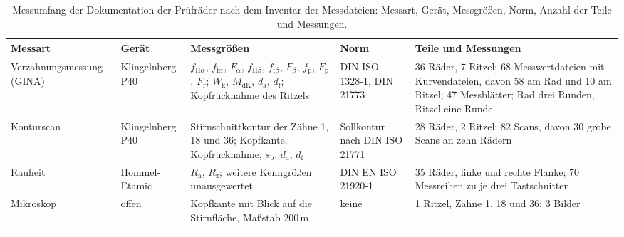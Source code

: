 \begin{table}[htbp]
	\caption{Messumfang der Dokumentation der Prüfräder nach dem Inventar der Messdateien: Messart, Gerät, Messgrößen, Norm, Anzahl der Teile und Messungen.}
	\label{tab:messumfang}
	\centering
	\footnotesize
	\setlength{\tabcolsep}{3pt}
	\begin{tabular}{L{2.4cm}L{2.0cm}L{4.3cm}L{2.2cm}L{3.9cm}}
		Messart                     & Gerät            & Messgrößen                                                                                                                                                                                                                                                                        & Norm                          & Teile und Messungen                                                                                                                            \\
		\hline
		Verzahnungs\-messung (GINA) & Klingelnberg P40 & $f_{\mathrm{H}\alpha}$, $f_{\mathrm{f}\alpha}$, $F_{\alpha}$, $f_{\mathrm{H}\beta}$, $f_{\mathrm{f}\beta}$, $F_{\beta}$, $f_{\mathrm{p}}$, $F_{\mathrm{p}}$, $F_{\mathrm{r}}$; $W_{\mathrm{k}}$, $M_{\mathrm{dK}}$, $d_{\mathrm{a}}$, $d_{\mathrm{f}}$; Kopfrücknahme des Ritzels & DIN ISO 1328-1, DIN 21773     & 36 Räder, 7 Ritzel; 68 Messwertdateien mit Kurvendateien, davon 58 am Rad und 10 am Ritzel; 47 Messblätter; Rad drei Runden, Ritzel eine Runde \\
		\hline
		Konturscan                  & Klingelnberg P40 & Stirnschnittkontur der Zähne 1, 18 und 36; Kopfkante, Kopfrücknahme, $s_{\mathrm{b}}$, $d_{\mathrm{a}}$, $d_{\mathrm{f}}$                                                                                                                                                         & Sollkontur nach DIN ISO 21771 & 28 Räder, 2 Ritzel; 82 Scans, davon 30 grobe Scans an zehn Rädern                                                                              \\
		\hline
		Rauheit                     & Hommel-Etamic    & $R_{\mathrm{a}}$, $R_{\mathrm{z}}$; weitere Kenngrößen unausgewertet                                                                                                                                                                                                              & DIN EN ISO 21920-1 \cite{DINENISO21920-1} & 35 Räder, linke und rechte Flanke; 70 Messreihen zu je drei Tastschnitten                                                                      \\
		\hline
		Mikroskop                   & offen            & Kopfkante mit Blick auf die Stirnfläche, Maßstab $200$\,\textmu m                                                                                                                                                                                                                                & keine                         & 1 Ritzel, Zähne 1, 18 und 36; 3 Bilder                                                                                                         \\
		\hline
	\end{tabular}
\end{table}

